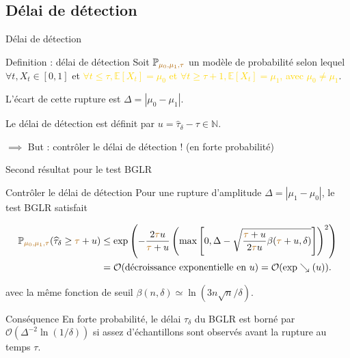 \documentclass[11pt,french,ignorenonframetext,]{beamer}
\begin{document}
\subsection{\hfill{}Délai de détection\hfill{}}

\begin{frame}{Délai de détection}


  \begin{block}{Definition : délai de détection}
    Soit $\mathbb{P}_{\textcolor{gold}{\mu_0,\mu_1,\tau}}$ un modèle de probabilité selon lequel $\forall t, X_t \in[0,1]$ et \textcolor{gold}{$\forall t \leq \tau, \mathbb{E}[X_t] = \mu_0$ et $\forall t \geq \tau + 1, \mathbb{E}[X_t] = \mu_1$,
    avec $\mu_0 \neq \mu_1$}.

    L'\alert{écart} de cette rupture est $\Delta = |\mu_0 - \mu_1|$.

    Le \alert{délai de détection} est définit par $u = \widehat{\tau}_{\delta} - \tau \in\mathbb{N}$.
  \end{block}

  \alert{$\implies$ But : contrôler le délai de détection !} (en forte probabilité)

\end{frame}

\begin{frame}{Second résultat pour le test BGLR \dSmiley{}}

  \begin{block}{Contrôler le délai de détection}
      Pour une rupture d'amplitude $\Delta = |\mu_1 - \mu_0|$,
      le test BGLR satisfait
      \begin{small}
        \begin{align*}
            \mathbb{P}_{\textcolor{gold}{\mu_0,\mu_1,\tau}} (\widehat{\tau}_{\delta} \geq \textcolor{gold}{\tau} + u) &\leq \exp\left( -\frac{2\textcolor{gold}{\tau} u}{\textcolor{gold}{\tau} + u}\left(\max\left[ 0, \Delta - \sqrt{\frac{\textcolor{gold}{\tau} + u}{2\textcolor{gold}{\tau} u} \beta(\textcolor{gold}{\tau} + u,\delta)} \right]\right)^2 \right) \\
            &= \mathcal{O}(\text{décroissance exponentielle en~} u)
            = \mathcal{O}(\exp\searrow(u)).
        \end{align*}
      \end{small}
      avec la même fonction de seuil
      $\beta(n,\delta) \simeq \ln(3n \sqrt{n}/\delta)$.
  \end{block}

  \begin{exampleblock}{Conséquence}
    En forte probabilité, \alert{le délai $\widehat{\tau}_\delta$ du BGLR est borné} par $\mathcal{O}(\Delta^{-2} \ln(1/\delta))$ \alert{si assez d'échantillons sont observés avant la rupture} au temps $\tau$.
  \end{exampleblock}

\end{frame}
\end{document}

